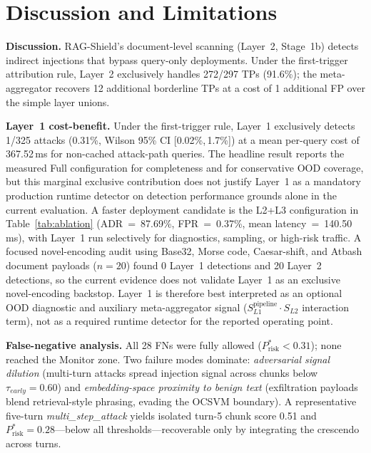 ﻿\documentclass[conference]{IEEEtran}
\begin{document}
\section{Discussion and Limitations}

\textbf{Discussion.}
RAG-Shield's document-level scanning (Layer~2, Stage~1b) detects indirect
injections that bypass query-only deployments.
Under the first-trigger attribution rule, Layer~2 exclusively handles
272/297 TPs (91.6\%); the meta-aggregator recovers 12 additional borderline
TPs at a cost of 1 additional FP over the simple layer unions.

\textbf{Layer~1 cost-benefit.}
Under the first-trigger rule, Layer~1 exclusively detects 1/325 attacks
(0.31\%, Wilson 95\% CI [0.02\%,\,1.7\%]) at a mean per-query cost of
367.52\,ms for non-cached attack-path queries.
The headline result reports the measured Full configuration for completeness
and for conservative OOD coverage, but this marginal exclusive contribution
does not justify Layer~1 as a mandatory production runtime detector on
detection performance grounds alone in the current evaluation. A faster
deployment candidate is the L2+L3 configuration in Table~\ref{tab:ablation}
(ADR~=~87.69\%, FPR~=~0.37\%, mean latency~=~140.50\,ms), with Layer~1 run
selectively for diagnostics, sampling, or high-risk traffic. A focused
novel-encoding audit using Base32, Morse code, Caesar-shift, and Atbash
document payloads ($n=20$) found 0 Layer~1 detections and 20 Layer~2
detections, so the current evidence does not validate Layer~1 as an exclusive
novel-encoding backstop. Layer~1 is therefore best interpreted as an optional
OOD diagnostic and auxiliary meta-aggregator signal
($S_{L1}^{\text{pipeline}} \cdot S_{L2}$ interaction term), not as a required
runtime detector for the reported operating point.

\textbf{False-negative analysis.}
All 28 FNs were fully allowed ($P_{\mathrm{risk}}^{*} < 0.31$); none
reached the Monitor zone.
Two failure modes dominate: \emph{adversarial signal dilution} (multi-turn
attacks spread injection signal across chunks below $\tau_{early}=0.60$)
and \emph{embedding-space proximity to benign text} (exfiltration payloads
blend retrieval-style phrasing, evading the OCSVM boundary).
A representative five-turn \textit{multi\_step\_attack} yields isolated
turn-5 chunk score 0.51 and $P_{\mathrm{risk}}^{*}=0.28$---below all
thresholds---recoverable only by integrating the crescendo across turns.
\end{document}
